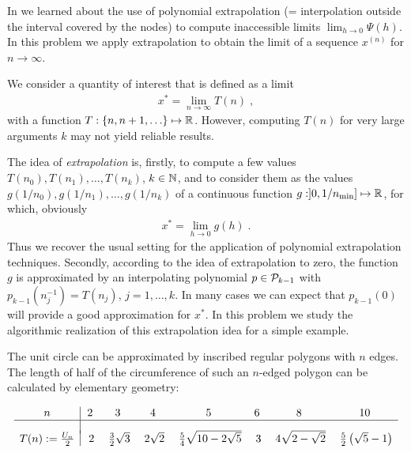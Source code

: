 \begin{problem}[Approximation of $\pi$]
In  we learned about the use of polynomial extrapolation
(= interpolation outside the interval covered by the nodes) to compute
inaccessible limits $\lim\nolimits_{h\to 0}\Psi(h)$. In this problem we apply
extrapolation to obtain the limit of a sequence $x^{(n)}$ for $n\to\infty$.

We consider a quantity of interest that is defined as a limit
  \begin{gather}
    \label{eq:1}
    x^{\ast} = \lim\limits_{n\to\infty} T(n)\;,
  \end{gather}
  with a function $T:\{n,n+1,\ldots\}\mapsto\mathbb{R}$. However, computing $T(n)$ for
  very large arguments $k$ may not yield reliable results.

  The idea of \emph{extrapolation} is, firstly, to compute a few values
  $T(n_{0}),T(n_{1}),\ldots,T(n_{k})$, $k\in\mathbb{N}$, and to consider them as the values 
  $g(1/n_{0}),g(1/n_{1}),\ldots,g(1/n_{k})$ of a continuous function
  $g:]0,1/n_{\min}]\mapsto\mathbb{R}$, for which, obviously
  \begin{gather}
    \label{eq:2}
    x^{\ast} = \lim\limits_{h\to 0} g(h)\;.
  \end{gather}
  Thus we recover the usual setting for the application of polynomial
  extrapolation techniques. Secondly, according to the idea of extrapolation to
  zero, the function $g$ is approximated by an interpolating polynomial
  $p\in{\cal P}_{k-1}$ with $p_{k-1}(n_{j}^{-1}) = T(n_{j})$, $j=1,\ldots,k$. In many
  cases %
  we can expect that $p_{k-1}(0)$ will
  provide a good approximation for $x^{\ast}$.  In this problem we study the
  algorithmic realization of this extrapolation idea for a simple example.

  The unit circle can be approximated by inscribed regular polygons with $n$ edges.
  The length of half of the circumference of such an $n$-edged polygon
  can be calculated by elementary geometry:
   
    \[
    \begin{array}{c|ccccccc}
      n & 2 & 3 & 4 & 5 & 6 & 8 & 10 \\
      \hline
        &  &  &  &  &  &  &  \\[-\smallskipamount]
      T(n) := \frac{U_n}{2} &\; 2 &\; \frac{3}{2}\sqrt{3} &\; 2 \sqrt{2} &\;
                                                                           \frac{5}{4}\sqrt{10-2\sqrt{5}} &\; 3 &\; 4\sqrt{2-\sqrt{2}} &\;
                                                                                                                                         \frac{5}{2} \left ( \sqrt{5}-1 \right )
    \end{array}
    \]


\end{problem}
